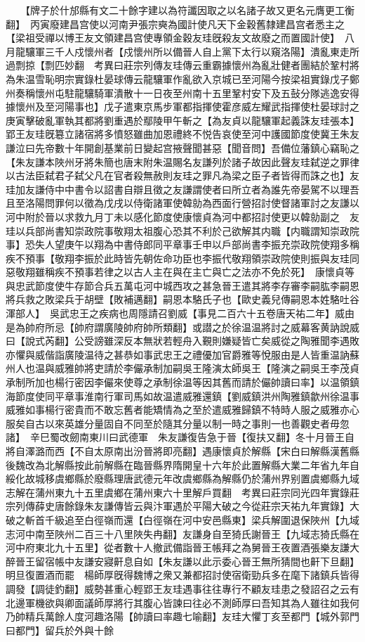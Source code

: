 　　【牌子於什邡縣有文二十餘字建以為符讖因取之以名諸子故又更名元膺更工衡翻】　丙寅廢建昌宫使以河南尹張宗奭為國計使凡天下金穀舊隸建昌宫者悉主之【梁祖受禪以博王友文領建昌宫使專領金穀友珪旣殺友文故廢之而置國計使】　八月龍驤軍三千人戍懷州者【戍懷州所以備晉人自上黨下太行以窺洛陽】潰亂東走所過剽掠【剽匹妙翻　考異曰莊宗列傳友珪傳云重霸據懷州為亂壯健者團結於鞏村將為朱温雪恥明宗實錄杜晏球傳云龍驤軍作亂欲入京城已至河陽今按梁祖實錄戊子鄭州奏稱懷州屯駐龍驤騎軍潰散十一日夜至州南十五里鞏村安下及五鼔分隊逃逸安得據懷州及至河陽事也】戊子遣東京馬步軍都指揮使霍彦威左耀武指揮使杜晏球討之庚寅擊破亂軍執其都將劉重遇於鄢陵甲午斬之【為友貞以龍驤軍起義誅友珪張本】　郢王友珪旣簒立諸宿將多憤怒雖曲加恩禮終不悦告哀使至河中護國節度使冀王朱友謙泣曰先帝數十年開創基業前日變起宫掖聲聞甚惡【聞音問】吾備位藩鎮心竊恥之【朱友謙本陜州牙將朱簡也唐末附朱温賜名友謙列於諸子故因此聲友珪弑逆之罪律以古法臣弑君子弑父凡在官者殺無赦則友珪之罪凡為梁之臣子者皆得而誅之也】友珪加友謙侍中中書令以詔書自辯且徵之友謙謂使者曰所立者為誰先帝晏駕不以理吾且至洛陽問罪何以徵為戊戌以侍衛諸軍使韓勍為西面行營招討使督諸軍討之友謙以河中附於晉以求救九月丁未以感化節度使康懷貞為河中都招討使更以韓勍副之　友珪以兵部尚書知崇政院事敬翔太祖腹心恐其不利於己欲解其内職【内職謂知崇政院事】恐失人望庚午以翔為中書侍郎同平章事壬申以戶部尚書李振充崇政院使翔多稱疾不預事【敬翔李振於此時皆先朝佐命功臣也李振代敬翔領崇政院使則振與友珪同惡敬翔雖稱疾不預事若律之以古人主在與在主亡與亡之法亦不免於死】　康懷貞等與忠武節度使牛存節合兵五萬屯河中城西攻之甚急晉王遣其將李存審李嗣肱李嗣恩將兵救之敗梁兵于胡壁【敗補邁翻】嗣恩本駱氏子也【歐史義兒傳嗣恩本姓駱吐谷渾部人】　吳武忠王之疾病也周隱請召劉威【事見二百六十五卷唐天祐二年】威由是為帥府所忌【帥府謂廣陵帥府帥所類翻】或譛之於徐温温將討之威幕客黄訥說威曰【說式芮翻】公受謗雖深反本無狀若輕舟入覲則嫌疑皆亡矣威從之陶雅聞李遇敗亦懼與威偕詣廣陵温待之甚恭如事武忠王之禮優加官爵雅等悅服由是人皆重温訥蘇州人也温與威雅帥將吏請於李儼承制加嗣吳王隆演太師吳王【隆演之嗣吳王李茂貞承制所加也楊行密因李儼來使尊之承制徐温等因其舊而請於儼帥讀曰率】以温領鎮海節度使同平章事淮南行軍司馬如故温遣威雅還鎮【劉威鎮洪州陶雅鎮歙州徐温事威雅如事楊行密貴而不敢忘舊者能矯情為之至於遣威雅歸鎮不特時人服之威雅亦心服矣自古以來英雄分量固自不同至於隨其分量以制一時之事則一也善觀史者毋忽諸】　辛巳蜀改劒南東川曰武德軍　朱友謙復告急于晉【復扶又翻】冬十月晉王自將自澤潞而西【不自太原南出汾晉將即亮翻】遇康懷貞於解縣【宋白曰解縣漢舊縣後魏改為北解縣按此前解縣在臨晉縣界隋開皇十六年於此置解縣大業二年省九年自綏化故城移虞鄉縣於廢縣理唐武德元年改虞鄉縣為解縣仍於蒲州界别置虞鄉縣九域志解在蒲州東九十五里虞鄉在蒲州東六十里解戶買翻　考異曰莊宗同光四年實錄莊宗列傳薛史唐餘錄朱友謙傳皆云與汴軍遇於平陽大破之今從莊宗天祐九年實錄】大破之斬首千級追至白徑嶺而還【白徑嶺在河中安邑縣東】梁兵解圍退保陜州【九域志河中南至陜州二百三十八里陜失冉翻】友謙身自至猗氏謝晉王【九域志猗氏縣在河中府東北九十五里】從者數十人撤武備詣晉王帳拜之為舅晉王夜置酒張樂友謙大醉晉王留宿帳中友謙安寢鼾息自如【朱友謙以此示委心晉王無所猜間也鼾下旦翻】明旦復置酒而罷　楊師厚旣得魏博之衆又兼都招討使宿衛勁兵多在麾下諸鎮兵皆得調發【調徒釣翻】威勢甚重心輕郢王友珪遇事往往專行不顧友珪患之發詔召之云有北邊軍機欲與卿面議師厚將行其腹心皆諫曰往必不測師厚曰吾知其為人雖往如我何乃帥精兵萬餘人度河趣洛陽【帥讀曰率趣七喻翻】友珪大懼丁亥至都門【城外郭門曰都門】留兵於外與十餘